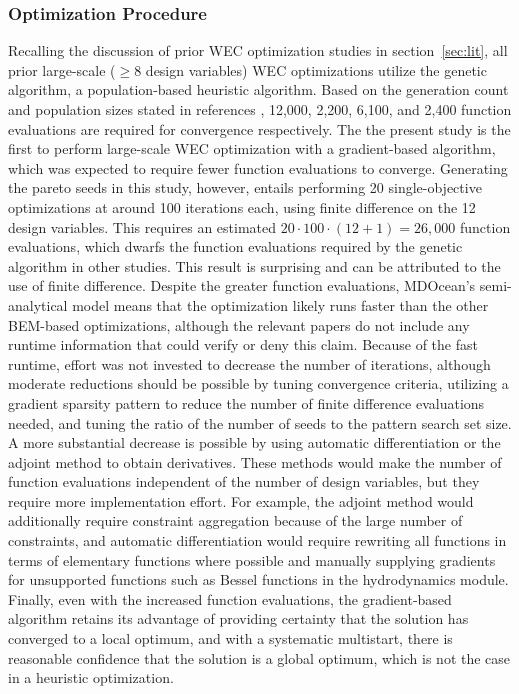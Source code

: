 \subsubsection{Optimization Procedure}
Recalling the discussion of prior WEC optimization studies in section~\ref{sec:lit}, all prior large-scale ($\geq8$ design variables) WEC optimizations utilize the genetic algorithm, a population-based heuristic algorithm. Based on the generation count and population sizes stated in references \cite{khanal_multi-objective_2024,garcia-teruel_reliability-based_2021,cotten_multi-objective_2022,abdulkadir_control_2024}, 12,000, 2,200, 6,100, and 2,400 function evaluations are required for convergence respectively. The the present study is the first to perform large-scale WEC optimization with a gradient-based algorithm, which was expected to require fewer function evaluations to converge. Generating the pareto seeds in this study, however, entails performing 20 single-objective optimizations at around 100 iterations each, using finite difference on the 12 design variables. This requires an estimated $20\cdot100\cdot(12+1)=26,000$ function evaluations, which dwarfs the function evaluations required by the genetic algorithm in other studies. This result is surprising and can be attributed to the use of finite difference. Despite the greater function evaluations, MDOcean's semi-analytical model means that the optimization likely runs faster than the other BEM-based optimizations, although the relevant papers do not include any runtime information that could verify or deny this claim. Because of the fast runtime, effort was not invested to decrease the number of iterations, although moderate reductions should be possible by tuning convergence criteria, utilizing a gradient sparsity pattern to reduce the number of finite difference evaluations needed, and tuning the ratio of the number of seeds to the pattern search set size. A more substantial decrease is possible by using automatic differentiation or the adjoint method to obtain derivatives. These methods would make the number of function evaluations independent of the number of design variables, but they require more implementation effort. For example, the adjoint method would additionally require constraint aggregation because of the large number of constraints, and automatic differentiation would require rewriting all functions in terms of elementary functions where possible and manually supplying gradients for unsupported functions such as Bessel functions in the hydrodynamics module. Finally, even with the increased function evaluations, the gradient-based algorithm retains its advantage of providing certainty that the solution has converged to a local optimum, and with a systematic multistart, there is reasonable confidence that the solution is a global optimum, which is not the case in a heuristic optimization.

